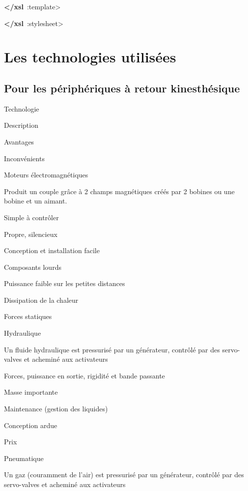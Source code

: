 \documentclass[
]{book}
\newenvironment{Shaded}{\begin{snugshade}}{\end{snugshade}}
\newcommand{\KeywordTok}[1]{\textcolor[rgb]{0.13,0.29,0.53}{\textbf{#1}}}
\newcommand{\NormalTok}[1]{#1}
\begin{document}
\begin{Shaded}
\begin{Highlighting}[]
  \KeywordTok{\textless{}/xsl}\NormalTok{ :template\textgreater{}}

\KeywordTok{\textless{}/xsl}\NormalTok{ :stylesheet\textgreater{}}

\end{Highlighting}
\end{Shaded}

\hypertarget{les-technologies-utilisuxe9es}{%
\section{Les technologies utilisées}\label{les-technologies-utilisuxe9es}}

\hypertarget{pour-les-puxe9riphuxe9riques-uxe0-retour-kinesthuxe9sique}{%
\subsection{Pour les périphériques à retour kinesthésique}\label{pour-les-puxe9riphuxe9riques-uxe0-retour-kinesthuxe9sique}}

Technologie

Description

Avantages

Inconvénients

Moteurs électromagnétiques

Produit un couple grâce à 2 champs
magnétiques créés par 2 bobines ou une bobine et un aimant.

Simple à contrôler

Propre, silencieux

Conception et installation facile

Composants lourds

Puissance faible sur les petites
distances

Dissipation de la chaleur

Forces statiques

Hydraulique

Un fluide hydraulique est pressurisé
par un générateur, contrôlé par des servo-valves et acheminé aux
activateurs

Forces, puissance en sortie, rigidité et
bande passante

Masse importante

Maintenance (gestion des liquides)

Conception ardue

Prix

Pneumatique

Un gaz (couramment de l'air) est
pressurisé par un générateur, contrôlé par des servo-valves et
acheminé aux activateurs
\end{document}
